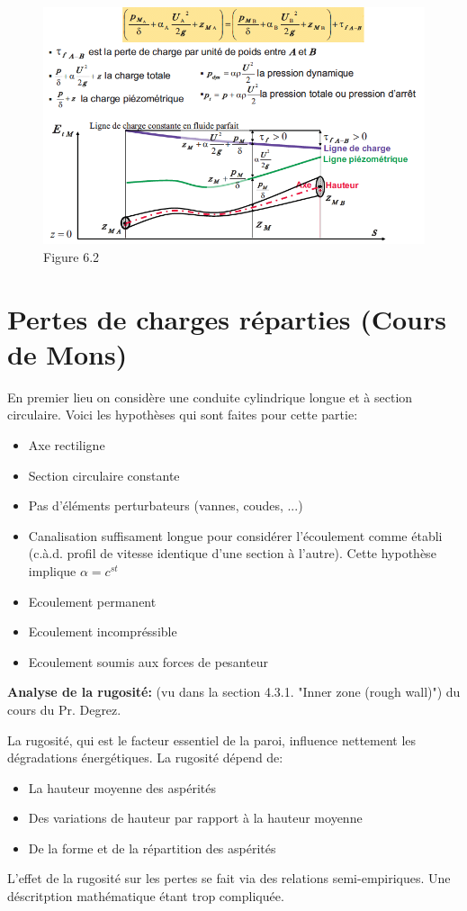 \begin{figure}[h]
\begin{center}
\includegraphics[scale=0.45]{ch6/62.png}
\caption*{Figure 6.2}
\end{center}
\end{figure}

\section{Pertes de charges réparties (Cours de Mons)}

En premier lieu on considère une conduite cylindrique longue et à section circulaire. Voici les hypothèses qui sont faites pour cette partie:
\begin{itemize}
\item Axe rectiligne
\item Section circulaire constante
\item Pas d'éléments perturbateurs (vannes, coudes, ...)
\item Canalisation suffisament longue pour considérer l'écoulement comme établi (c.à.d. profil de vitesse identique d'une section à l'autre). Cette hypothèse implique $\alpha=c^{st}$
\item Ecoulement permanent
\item Ecoulement incompréssible
\item Ecoulement soumis aux forces de pesanteur \\
\end{itemize}


\textbf{Analyse de la rugosité:} (vu dans la section 4.3.1. "Inner zone (rough wall)") du cours du Pr. Degrez.

La rugosité, qui est le facteur essentiel de la paroi, influence nettement les dégradations énergétiques. La rugosité dépend de: 
\begin{itemize}
\item La hauteur moyenne des aspérités
\item Des variations de hauteur par rapport à la hauteur moyenne
\item De la forme et de la répartition des aspérités
\end{itemize}
L'effet de la rugosité sur les pertes se fait via des relations semi-empiriques. Une déscritption mathématique étant trop compliquée.
\\

